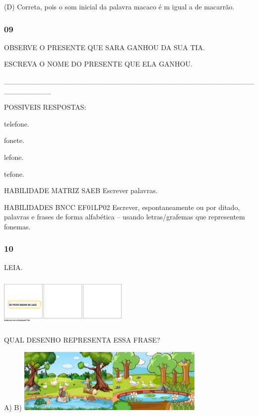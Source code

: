 \begin{escola}
(D) Correta, pois o som inicial da palavra macaco é m igual a de
macarrão.\protect\hypertarget{_heading=h.z3c8l2ojus6u}{}{}

\subsubsection{09}\label{section-81}

OBSERVE O PRESENTE QUE SARA GANHOU DA SUA TIA.

ESCREVA O NOME DO PRESENTE QUE ELA GANHOU.

\_\_\_\_\_\_\_\_\_\_\_\_\_\_\_\_\_\_\_\_\_\_\_\_\_\_\_\_\_\_\_\_\_\_\_\_\_\_\_\_\_\_\_\_\_\_\_\_\_\_\_\_\_\_\_\_\_

POSSIVEIS RESPOSTAS:

telefone.

fonete.

lefone.

tefone.

HABILIDADE MATRIZ SAEB Escrever palavras.

HABILIDADES BNCC EF01LP02 Escrever, espontaneamente ou por ditado,
palavras e frases de forma alfabética -- usando letras/grafemas que
representem fonemas.

\subsubsection{10}\label{section-82}

LEIA.

\includegraphics[width=2.46358in,height=0.98459in]{media/image249.png}

QUAL DESENHO REPRESENTA ESSA FRASE?

A) B)
\includegraphics[width=1.85903in,height=1.21806in]{media/image250.jpg}\includegraphics[width=1.71806in,height=1.21875in]{media/image251.jpg}


\end{escola}
